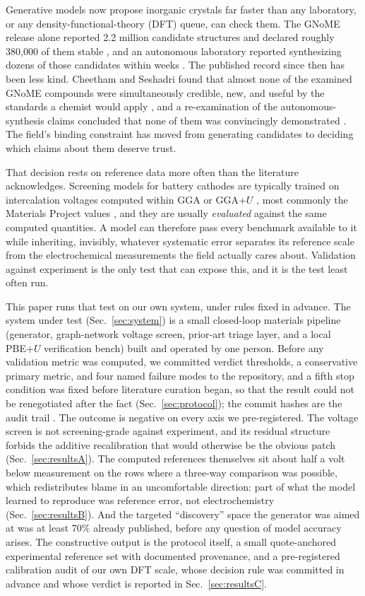 \documentclass[reprint,aps,prb,amsmath,amssymb,nofootinbib,longbibliography]{revtex4-2}
\begin{document}
Generative models now propose inorganic crystals far faster than any
laboratory, or any density-functional-theory (DFT) queue, can check them. The
GNoME release alone reported 2.2 million candidate structures and declared
roughly 380{,}000 of them stable \cite{merchant2023}, and an autonomous
laboratory reported synthesizing dozens of those candidates within weeks
\cite{szymanski2023}. The published record since then has been less kind.
Cheetham and Seshadri found that almost none of the examined GNoME compounds
were simultaneously credible, new, and useful by the standards a chemist would
apply \cite{cheetham2024}, and a re-examination of the autonomous-synthesis
claims concluded that none of them was convincingly demonstrated
\cite{leeman2024}. The field's binding constraint has moved from generating
candidates to deciding which claims about them deserve trust.

That decision rests on reference data more often than the literature
acknowledges. Screening models for battery cathodes are typically trained on
intercalation voltages computed within GGA or GGA+$U$
\cite{aydinol1997,wang2006}, most commonly the Materials Project values
\cite{jain2013}, and they are usually \emph{evaluated} against the same
computed quantities. A model can therefore pass every benchmark available to
it while inheriting, invisibly, whatever systematic error separates its
reference scale from the electrochemical measurements the field actually
cares about. Validation against experiment is the only test that can expose
this, and it is the test least often run.

This paper runs that test on our own system, under rules fixed in advance.
The system under test (Sec.~\ref{sec:system}) is a small closed-loop materials
pipeline (generator, graph-network voltage screen, prior-art triage layer,
and a local PBE+$U$ verification bench) built and operated by one person.
Before any validation metric was computed, we committed verdict thresholds, a
conservative primary metric, and four named failure modes to the repository,
and a fifth stop condition was fixed before literature curation began, so
that the result could not be renegotiated after the fact
(Sec.~\ref{sec:protocol}); the commit hashes are the audit trail
\cite{nosek2018}. The outcome is negative on every axis we pre-registered.
The voltage screen is not screening-grade against experiment, and its residual
structure forbids the additive recalibration that would otherwise be the
obvious patch (Sec.~\ref{sec:resultsA}). The computed references themselves
sit about half a volt below measurement on the rows where a three-way
comparison was possible, which redistributes blame in an uncomfortable
direction: part of what the model learned to reproduce was reference error,
not electrochemistry (Sec.~\ref{sec:resultsB}). And the targeted ``discovery''
space the generator was aimed at was at least 70\% already published, before
any question of model accuracy arises. The constructive output is the
protocol itself, a small quote-anchored experimental reference set with
documented provenance, and a pre-registered calibration audit of our own DFT
scale, whose decision rule was committed in advance and whose verdict is
reported in Sec.~\ref{sec:resultsC}.
\end{document}
